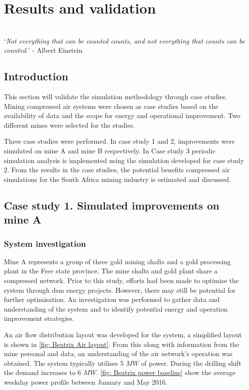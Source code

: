 \chapter{Results and validation}
\thispagestyle{empty}
\vspace{38em}
\hrulefill
\\


\enquote*{\textit{Not everything that can be counted counts, and not everything that counts can be counted.}} - Albert Einstein\\
\newpage
\section{Introduction}
This section will validate the simulation methodology through case studies. Mining compressed air systems were chosen as case studies based on the availability of data and the scope for energy and operational improvement. Two different mines were selected for the studies. 
\par 
Three case studies were performed. In case study 1 and 2, improvements were simulated on mine A and mine B respectively. In Case study 3 periodic simulation analysis is implemented using the simulation developed for case study 2. From the results in the case studies, the potential benefits compressed air simulations for the South Africa mining industry is estimated and discussed.

\section{Case study 1. Simulated improvements on mine A}
\subsection{System investigation}
Mine A represents a group of three gold mining shafts and a gold processing plant in the Free state province. The mine shafts and gold plant share a compressed network. Prior to this study, efforts had been made to optimise the system through \gls{dsm} energy projects. However, there may still be potential for further optimisation. An investigation was performed to gather data and understanding of the system and to identify potential energy and operation improvement strategies.
\par 
An air flow distribution layout was developed for the system, a simplified layout is shown in \cref{fig: Beatrix Air layout}. From this along with information from the mine personal and data, an understanding of the air network's operation was obtained. The system typically utilises 5 $MW$ of power. During the drilling shift the demand increases to 6 $MW$. \cref{fig: Beatrix power baseline} show the average weekday power profile between January and May 2016.

